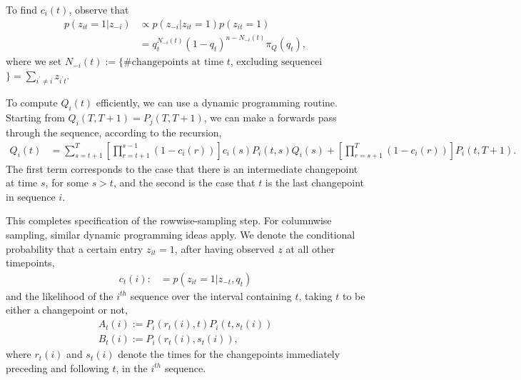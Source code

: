 \documentclass[14pt]{extreport}
\begin{document}
To find $c_{i}\left(t\right)$, observe that
\begin{align*}
  p\left(z_{it} = 1 \vert z_{-i}\right) &\propto p\left(z_{-i} \vert z_{it} = 1\right) p\left(z_{it} = 1\right) \\
  &= q_{t}^{N_{-i}\left(t\right)} \left(1 - q_{t}\right)^{n - N_{-i}\left(t\right)} \pi_{Q}\left(q_{t}\right),
\end{align*}
where we set $N_{-i}\left(t\right) := \{\# \text{changepoints at time $t$,
excluding sequence} $i$\} = \sum_{i^\prime \neq i} z_{i^\prime t}$.

To compute $Q_{i}\left(t\right)$ efficiently, we can use a dynamic programming
routine. Starting from $Q_{i}\left(T, T + 1\right) = P_{j}\left(T, T +
1\right)$, we can make a forwards pass through the sequence, according to the
recursion,
\begin{align*}
  Q_{i}\left(t\right) &= \sum_{s = t + 1}^{T} \left[\prod_{r = t + 1}^{s - 1} \left(1 - c_{i}\left(r\right)\right)\right]c_{i}\left(s\right)P_{i}\left(t, s\right)Q_{i}\left(s\right) +
  \left[\prod_{r = s + 1}^{T}\left(1 - c_{i}\left(r\right)\right)\right]P_{i}\left(t, T + 1\right).
\end{align*}
The first term corresponds to the case that there is an intermediate changepoint
at time $s$, for some $s > t$, and the second is the case that $t$ is the last
changepoint in sequence $i$.

This completes specification of the rowwise-sampling step. For columnwise
sampling, similar dynamic programming ideas apply. We denote the
conditional probability that a certain entry $z_{it} = 1$, after having observed
$z$ at all other timepoints,
\begin{align*}
  c_{t}\left(i\right) :&= p\left(z_{it} = 1 \vert z_{-t}, q_{t}\right)
\end{align*}
and the likelihood of the $i^{th}$ sequence over the interval containing $t$,
taking $t$ to be either a changepoint or not,
\begin{align*}
  A_{t}\left(i\right) := P_{i}\left(r_{t}\left(i\right), t\right)P_{i}\left(t, s_{t}\left(i\right)\right) \\
  B_{t}\left(i\right) := P_{i}\left(r_{t}\left(i\right), s_{t}\left(i\right)\right),
\end{align*}
where $r_{t}\left(i\right)$ and $s_{t}\left(i\right)$ denote the times for the
changepoints immediately preceding and following $t$, in the $i^{th}$ sequence.
\end{document}

